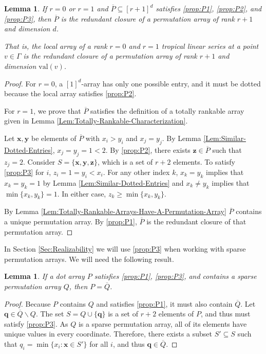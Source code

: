 \documentclass{amsart}
\newtheorem{lemma}[theorem]{Lemma}
\begin{document}
	\begin{lemma}
		\label{Lem:local-arrays-are-redundant-closures-low-rank}
		If $r = 0$ or $r = 1$ and $\overline{P} \subseteq [r+1]^d$ satisfies \ref{prop:P1}, \ref{prop:P2}, and \ref{prop:P3}, then $\overline{P}$ is the redundant closure of a permutation array of rank $r+1$ and dimension $d$.
		
		That is, the local array of a rank $r=0$ and $r=1$ tropical linear series at a point $v \in \Gamma$ is the redundant closure of a permutation array of rank $r+1$ and dimension $\mathrm{val}(v)$.
	\end{lemma}
	
	\begin{proof}
		For $r = 0$, a $[1]^d$-array has only one possible entry, and it must be dotted because the local array satisfies \ref{prop:P2}.
		
		For $r = 1$, we prove that $\overline{P}$ satisfies the definition of a totally rankable array given in Lemma \ref{Lem:Totally-Rankable-Characterization}.
		
		Let $\mathbf{x}, \mathbf{y}$ be elements of $\overline{P}$ with $x_i > y_i$ and $x_j = y_j$. By Lemma \ref{Lem:Similar-Dotted-Entries}, $x_j = y_j = 1 < 2$. By \ref{prop:P2}, there exists $\mathbf{z} \in \overline{P}$ such that $z_j = 2$. Consider $S = \{ \mathbf{x}, \mathbf{y}, \mathbf{z} \}$, which is a set of $r+2$ elements. To satisfy \ref{prop:P3} for $i$, $z_i = 1 = y_i < x_i$. For any other index $k$, $x_k = y_k$ implies that $x_k = y_k = 1$ by Lemma \ref{Lem:Similar-Dotted-Entries} and $x_k \neq y_k$ implies that $\min \{ x_k, y_k \} = 1$. In either case, $z_k \geq \min \{ x_k, y_k \}$.
		
		By Lemma \ref{Lem:Totally-Rankable-Arrays-Have-A-Permutation-Array} $\overline{P}$ contains a unique permutation array. By \ref{prop:P1}, $\overline{P}$ is the redundant closure of that permutation array.
	\end{proof}
	
	In Section \ref{Sec:Realizability} we will use \ref{prop:P3} when working with sparse permutation arrays. We will need the following result.
	
	\begin{lemma}
		\label{Lem:P3-and-perm-implies-redundant-perm}
		If a dot array $P$ satisfies \ref{prop:P1}, \ref{prop:P3}, and contains a sparse permutation array $Q$, then $P = \overline{Q}$.
	\end{lemma}
	
	\begin{proof}
		Because $P$ contains $Q$ and satisfies \ref{prop:P1}, it must also contain $\overline{Q}$. Let $\mathbf{q} \in \overline{Q} \backslash Q$. The set $S = Q \cup \{ \mathbf{q} \}$ is a set of $r+2$ elements of $P$, and thus must satisfy \ref{prop:P3}. As $Q$ is a sparse permutation array, all of its elements have unique values in every coordinate. Therefore, there exists a subset $S' \subseteq S$ such that $q_i = \min \{ x_i : \mathbf{x} \in S' \}$ for all $i$, and thus $\mathbf{q} \in \overline{Q}$.
	\end{proof}
	
\end{document}
